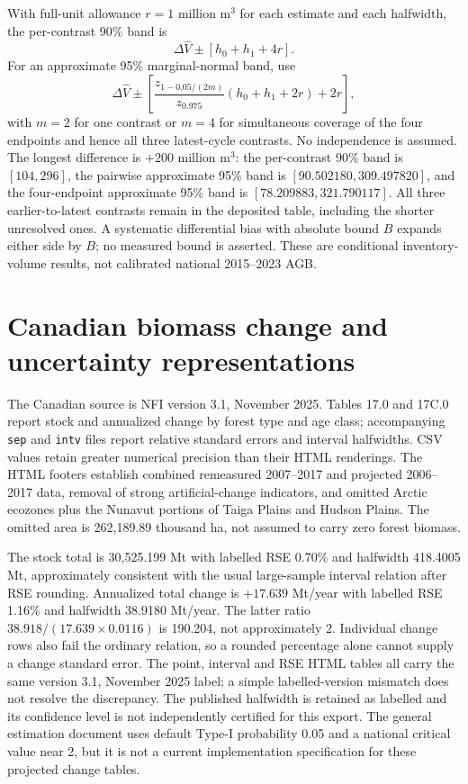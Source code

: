 With full-unit allowance $r=1$ million m$^3$ for each estimate and each halfwidth, the per-contrast 90\% band is
\[
\Delta\widehat V\pm[h_0+h_1+4r].
\]
For an approximate 95\% marginal-normal band, use
\[
\Delta\widehat V\pm\left[\frac{z_{1-0.05/(2m)}}{z_{0.975}}(h_0+h_1+2r)+2r\right],
\]
with $m=2$ for one contrast or $m=4$ for simultaneous coverage of the four endpoints and hence all three latest-cycle contrasts. No independence is assumed. The longest difference is $+200$ million m$^3$: the per-contrast 90\% band is $[104,296]$, the pairwise approximate 95\% band is $[90.502180,309.497820]$, and the four-endpoint approximate 95\% band is $[78.209883,321.790117]$. All three earlier-to-latest contrasts remain in the deposited table, including the shorter unresolved ones. A systematic differential bias with absolute bound $B$ expands either side by $B$; no measured bound is asserted. These are conditional inventory-volume results, not calibrated national 2015--2023 AGB.

\section{Canadian biomass change and uncertainty representations}
The Canadian source is NFI version 3.1, November 2025. Tables 17.0 and 17C.0 report stock and annualized change by forest type and age class; accompanying \texttt{sep} and \texttt{intv} files report relative standard errors and interval halfwidths. CSV values retain greater numerical precision than their HTML renderings. The HTML footers establish combined remeasured 2007--2017 and projected 2006--2017 data, removal of strong artificial-change indicators, and omitted Arctic ecozones plus the Nunavut portions of Taiga Plains and Hudson Plains. The omitted area is 262,189.89 thousand ha, not assumed to carry zero forest biomass.

The stock total is 30,525.199 Mt with labelled RSE 0.70\% and halfwidth 418.4005 Mt, approximately consistent with the usual large-sample interval relation after RSE rounding. Annualized total change is $+17.639$ Mt/year with labelled RSE 1.16\% and halfwidth 38.9180 Mt/year. The latter ratio $38.918/(17.639\times0.0116)$ is 190.204, not approximately 2. Individual change rows also fail the ordinary relation, so a rounded percentage alone cannot supply a change standard error. The point, interval and RSE HTML tables all carry the same version 3.1, November 2025 label; a simple labelled-version mismatch does not resolve the discrepancy. The published halfwidth is retained as labelled and its confidence level is not independently certified for this export. The general estimation document uses default Type-I probability 0.05 and a national critical value near 2, but it is not a current implementation specification for these projected change tables.

